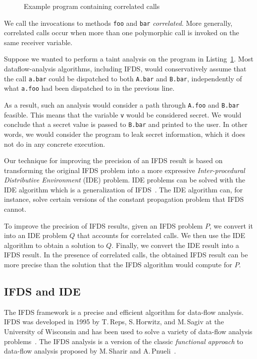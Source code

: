 \begin{figure}
  \centering
  \begin{minipage}{\textwidth}
  \end{minipage}
  \caption{Example program containing correlated calls}
  \label{list:ccexample}
\end{figure}

We call the invocations to methods \verb'foo' and \verb'bar' \textit{correlated}.
More generally, correlated calls occur when more than one polymorphic call is invoked on the same receiver variable.

Suppose we wanted to perform a taint analysis on the program in Listing~\ref{list:ccexample}.
Most dataflow-analysis algorithms, including IFDS, would conservatively assume that the call \verb'a.bar' could be dispatched to both \verb'A.bar' and \verb'B.bar', independently of what \verb'a.foo' had been dispatched to in the previous line.

As a result, 
such an analysis would consider a path through \verb'A.foo' and \verb'B.bar' feasible. This means that the variable \verb'v' would be considered secret. We would conclude that a secret value is passed to \verb'B.bar' and printed to the user. In other words, we would consider the program to leak secret information, which it does not do in any concrete execution.

Our technique for improving the precision of an IFDS result is based on transforming the original IFDS problem into a more expressive \textit{Inter-procedural Distributive Environment} (IDE) problem. IDE problems can be solved with the IDE algorithm which is a generalization of IFDS~\cite{sagiv1996precise}. The IDE algorithm can, for instance, solve certain versions of the constant propagation problem that IFDS cannot.

To improve the precision of IFDS results, given an IFDS problem $P$, we convert it into an IDE problem $Q$ that accounts for correlated calls. We then use the IDE algorithm to obtain a solution to $Q$. Finally, we convert the IDE result into a IFDS result. In the presence of correlated calls, the obtained IFDS result can be more precise than the solution that the IFDS algorithm would compute for $P$.

\subsection{IFDS and IDE}
The IFDS framework is a precise and efficient algorithm for data-flow analysis. IFDS was developed in 1995 by T.\,Reps, S.\,Horwitz, and M.\,Sagiv at the University of Wisconsin and has been used to solve a variety of data-flow analysis problems~\cite{bodden2013spl,naeem2008typestate,DBLP:conf/birthday/KreikerRRSWY13,tripp2009taj}. The IFDS analysis is a version of the classic \textit{functional approach} to data-flow analysis proposed by M.\,Sharir and A.\,Pnueli~\cite{pnueli1981two}.

